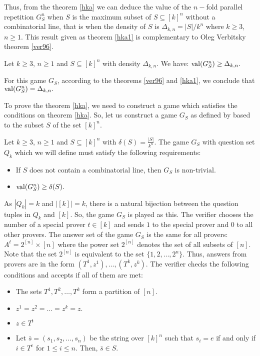 Thus, from the theorem \eqref{hka} we can deduce the value of the $n-$fold parallel repetition $G_S^n$ when $S$ is the maximum subset of  $S\subseteq [k]^n$ without a combinatorial line, that is when the density of $S$ is $\Delta_{k,n}= |S|/k^n$ where $k\geq 3$, $n\geq 1$. This result given as theorem \eqref{hka1} is complementary to  Oleg Verbitsky theorem \eqref{ver96}.

 \begin{thm} Let $k\geq 3$, $n\geq 1$ and $S\subseteq [k]^n$ with density $\Delta_{k,n}$. We have: 	
 $\mathrm{val} (G_S^n) \geq \Delta_{k,n}.$  \label{hka1}
 	\end{thm} 
For this  game $G_S$, according to the theorems \eqref{ver96} and \eqref{hka1}, we conclude that $\mathrm{val} (G_S^n)=\Delta_{k,n}.$

To prove  the theorem \eqref{hka}, we need to construct a game which  satisfies the conditions on theorem \eqref{hka}. So, let us construct a game $G_S$   as  defined by \cite{hkazla2016forbidden} based to the subset $S $ of the set $[k]^n$. 

Let $k \geq 3$, $n \geq 1$ and $S \subseteq [k]^n$ with $\delta (S)= \frac{|S|}{k^n}$. The game $G_S$ with question set $Q_k$ which we will define must satisfy the  following requirements: 
\begin{itemize}
\item If $S$ does not contain a combinatorial line, then $G_S$ is non-trivial. \item $\mathrm{val} (G_S^n) \geq \delta (S).$
\end{itemize}

As $|Q_k|=k$ and $|[k]|=k$, there is a natural bijection between the question tuples in $Q_k$ and $[k]$. So, the game $G_S$ is played as this. The verifier chooses the number of a special prover $t \in [k]$   and sends $1$ to the special prover and $0$ to all other provers. 
The answer set of the game $G_S$ is the same for all provers: $A^t=2^{[n]} \times [n]$ where the power set  $2^{[n]}$ denotes the set of all subsets of $[n]$. Note that the set $2^{[n]}$ is equivalent to the set $\{1,2,\ldots, 2^n\}.$ Thus, answers from provers are in the form $(T^1, z^1), \ldots, (T^k, z^k)$. The verifier checks the following conditions and accepts if all of them are met: 
\begin{itemize}
\item The sets $T^1, T^2,\ldots, T^k$ form a partition of $[n].$
\item $z^1=z^2=\ldots=z^k=z.$
\item $z \in T^t$
\item Let $\bar{s} = (s_1, s_2, \ldots, s_n)$ be the string over $[k]^n$ such that  $s_i = e$ if and only if $i \in  T ^e$ for $1\leq i \leq n.$ Then, $\bar{s} \in S.$
\end{itemize}

